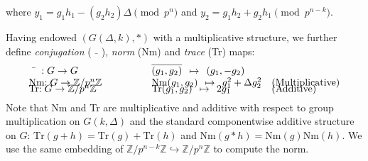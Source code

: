 \documentclass[12pt,reqno]{amsart}
\theoremstyle{remark}
\numberwithin{table}{section}
\newcommand{\Z}{\mathbb Z}
\begin{document}
\noindent where $y_1 = g_1h_1 - (g_2h_2) \Delta \pmod{p^n}$ and $ y_2 = g_1h_2 + g_2h_1 \pmod{p^{n-k}}$. 




Having endowed $(G(\Delta,k),*)$ with a multiplicative structure, we further define  {\em conjugation} (${\bar{\hspace{1em}} }$), {\em norm} (Nm) and {\em trace} (Tr) maps:
$$\begin{array}{lll}
{\bar{\hspace{1em}} }: G   \to  G &  \qquad \qquad \overline{(g_1,g_2)} \: \:  \mapsto \: \:   (g_1,-g_2) \\
\vspace{-.2cm}
 \mbox{Nm:}  \; G   \to    \Z/p^n \Z &  \qquad \qquad  \text{Nm}(g_1,g_2) \: \:  \mapsto \: \:   g_1^2 + \Delta g_2^2  & \text{(Multiplicative)} \\
\vspace{-.2cm}
 \text{Tr:} \; G   \to  \Z/p^n \Z & \qquad \qquad  \text{Tr}(g_1,g_2) \: \:  \mapsto \: \:   2g_1 \: \: \:  & \text{(Additive)} \end{array}$$


\medskip

Note that Nm and Tr are multiplicative and additive with respect to group multiplication on $G(k,\Delta)$ and the standard componentwise additive structure on $G$: $\text{Tr}(g + h) = \text{Tr}(g ) + 
\text{Tr}( h)$ and $\text{Nm}(g*h) = \text{Nm}(g)\text{Nm}(h)$. We use the same embedding of $\Z/p^{n-k}\Z\hookrightarrow\Z/p^n\Z$ to compute the norm. 
\end{document}
